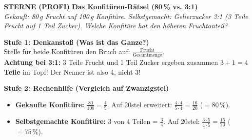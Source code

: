 \documentclass[a4paper,10pt]{article}
\newcommand{\mFrac}[2]{\frac{#1}{#2}}
\begin{document}
\begin{tcolorbox}[
    enhanced, colback=white, colframe=primaryBlue, arc=3mm, boxrule=1.2pt,
    left=4.5mm, right=4.5mm, top=2.5mm, bottom=2.5mm, height=12.9cm
]
    \begin{center}
        {\color{lvlPurple}\textbf{\faStar\faStar\faStar{} STERNE (PROFI)}}\quad
        {\color{primaryBlue}\large\bfseries {}\quad Das Konfitüren-Rätsel (80\,\% vs. 3:1)}\\[1mm]
        {\footnotesize\textit{Gekauft: 80\,g Frucht auf 100\,g Konfitüre. Selbstgemacht: Gelierzucker 3:1 (3 Teile Frucht auf 1 Teil Zucker). Welche Konfitüre hat den höheren Fruchtanteil?}}
    \end{center}
    \vspace{0.5mm}

    \begin{tcolorbox}[colback=step1Bg, colframe=step1Border, arc=2mm, boxrule=0.7pt, left=3mm, right=3mm, top=1.8mm, bottom=1.8mm]
        {\color{step1Text}\bfseries\faLightbulb\enskip Stufe 1: Denkanstoß (Was ist das Ganze?)}\\[0.8mm]
        {\small
        Stelle für beide Konfitüren den Bruch auf: $\mFrac{\text{Frucht}}{\text{Gesamtmenge}}$.\\
        {\color{step1Text}\faHandPointRight}\enskip \textbf{Achtung bei 3:1:} 3 Teile Frucht und 1 Teil Zucker ergeben zusammen \textbf{$3 + 1 = 4$ Teile} im Topf! Der Nenner ist also 4, nicht 3!
        }
    \end{tcolorbox}
    \vspace{0.8mm}

    \begin{tcolorbox}[colback=step2Bg, colframe=step2Border, arc=2mm, boxrule=0.7pt, left=3mm, right=3mm, top=1.8mm, bottom=1.8mm]
        {\color{step2Text}\bfseries\faSearch\enskip Stufe 2: Rechenhilfe (Vergleich auf Zwanzigstel)}\\[0.8mm]
        {\small
        \begin{itemize}[leftmargin=4mm, itemsep=0.2pt, topsep=1pt]
            \item \textbf{Gekaufte Konfitüre:} $\mFrac{80}{100} = \mFrac{4}{5}$. Auf 20stel erweitert: $\mFrac{4\cdot 4}{5\cdot 4} = \mFrac{16}{20}$ ($= 80\,\%$).
            \item \textbf{Selbstgemachte Konfitüre:} 3 von 4 Teilen = $\mFrac{3}{4}$. Auf 20stel: $\mFrac{3\cdot 5}{4\cdot 5} = \mFrac{15}{20}$ ($= 75\,\%$).
        \end{itemize}
        }
    \end{tcolorbox}
    \vspace{0.8mm}


\end{tcolorbox}
\end{document}
